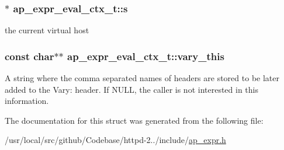 \subsubsection[{\texorpdfstring{s}{s}}]{$\ast$ ap\+\_\+expr\+\_\+eval\+\_\+ctx\+\_\+t\+::s}\hypertarget{structap__expr__eval__ctx__t_a5b31e6f1ba8756f0c24bcb6c46ea9903}{}\label{structap__expr__eval__ctx__t_a5b31e6f1ba8756f0c24bcb6c46ea9903}
the current virtual host 
\subsubsection[{\texorpdfstring{vary\+\_\+this}{vary_this}}]{\setlength{\rightskip}{0pt plus 5cm}const char$\ast$$\ast$ ap\+\_\+expr\+\_\+eval\+\_\+ctx\+\_\+t\+::vary\+\_\+this}\hypertarget{structap__expr__eval__ctx__t_a9f3c4c51c53ac551a8d10f87e8b09fea}{}\label{structap__expr__eval__ctx__t_a9f3c4c51c53ac551a8d10f87e8b09fea}
A string where the comma separated names of headers are stored to be later added to the Vary\+: header. If N\+U\+LL, the caller is not interested in this information. 

The documentation for this struct was generated from the following file\+:\begin{DoxyCompactItemize}
\item 
/usr/local/src/github/\+Codebase/httpd-\/2../include/\hyperlink{ap__expr_8h}{ap\+\_\+expr.\+h}\end{DoxyCompactItemize}
